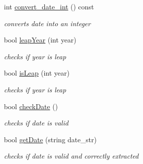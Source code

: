 \begin{DoxyCompactItemize}
int \hyperlink{class_date_a8e10a688e6056a4d62a8c5ba5de11e54}{convert\+\_\+date\+\_\+int} () const
\begin{DoxyCompactList}\small\item\em converts date into an integer \end{DoxyCompactList}\item 
bool \hyperlink{class_date_ac44b1159cfc6b4936fddd909b0c2a8f1}{leap\+Year} (int year)
\begin{DoxyCompactList}\small\item\em checks if year is leap \end{DoxyCompactList}\item 
bool \hyperlink{class_date_ab068a7017e7033adba1680de395c844e}{is\+Leap} (int year)
\begin{DoxyCompactList}\small\item\em checks if year is leap \end{DoxyCompactList}\item 
bool \hyperlink{class_date_ac4810ddec014ca51257871abac9667a9}{check\+Date} ()
\begin{DoxyCompactList}\small\item\em checks if date is valid \end{DoxyCompactList}\item 
bool \hyperlink{class_date_a5693be8bccd3d4bd431a2cb0ae042d02}{get\+Date} (string date\+\_\+str)
\begin{DoxyCompactList}\small\item\em checks if date is valid and correctly extracted \end{DoxyCompactList}\end{DoxyCompactItemize}
